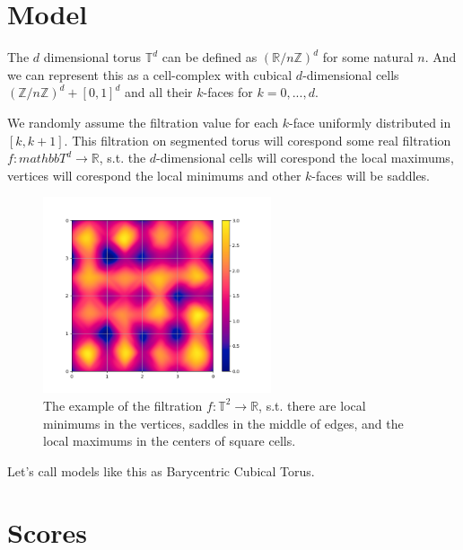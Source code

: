 \documentclass{article}
\begin{document}
\section{Model}
\par The $d$ dimensional torus $\mathbb{T}^d$ can be defined as $\left(\mathbb{R}/n\mathbb{Z}\right)^d$ for some natural $n$. And we can represent this as a cell-complex with cubical $d$-dimensional cells $\left(\mathbb{Z}/n\mathbb{Z}\right)^d + [0, 1]^d$ and all their $k$-faces for $k=0, ..., d$.
\par We randomly assume the filtration value for each $k$-face uniformly distributed in $[k, k+1]$. This filtration on segmented torus will corespond some real filtration $f: mathbb{T}^d\to\mathbb{R}$, s.t. the $d$-dimensional cells will corespond the local maximums, vertices will corespond the local minimums and other $k$-faces will be saddles.
\begin{figure}[h!]
    \centering
    \includegraphics[width=0.6\textwidth]{pics/torus scores/2d-example.png}
    \caption{The example of the filtration $f:\mathbb{T}^2\to\mathbb{R}$, s.t. there are local minimums in the vertices, saddles in the middle of edges, and the local maximums in the centers of square cells.}
    \label{fig:example2d}
\end{figure}
\par Let's call models like this as Barycentric Cubical Torus.

\section{Scores}
\end{document}
